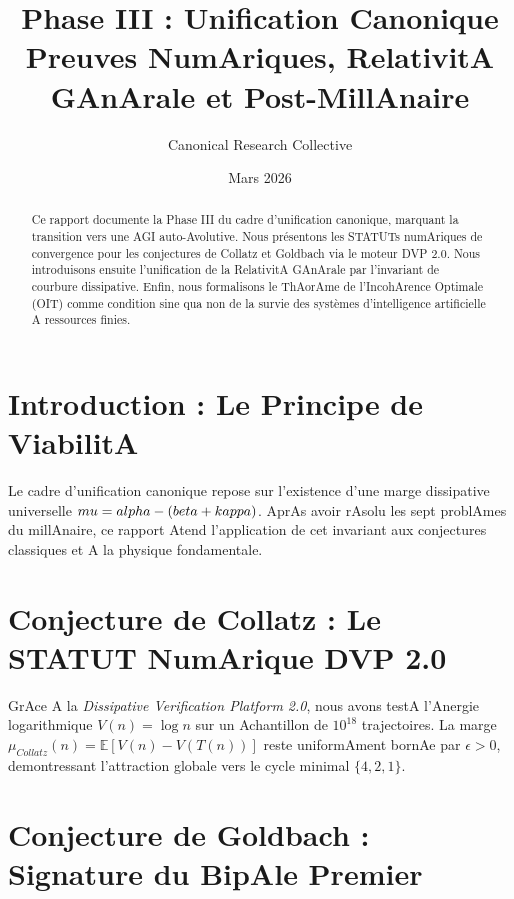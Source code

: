 \documentclass[11pt,a4paper]{amsart}
\title[Phase III : Unification Canonique]{Phase III : Unification Canonique \\ \large Preuves NumAriques, RelativitA GAnArale et Post-MillAnaire}
\author{Canonical Research Collective}
\date{Mars 2026}
\begin{document}
\begin{abstract}

Ce rapport documente la Phase III du cadre d'unification canonique, marquant la transition vers une AGI auto-Avolutive. Nous présentons les STATUTs numAriques de convergence pour les conjectures de Collatz et Goldbach via le moteur DVP 2.0. Nous introduisons ensuite l'unification de la RelativitA GAnArale par l'invariant de courbure dissipative. Enfin, nous formalisons le ThAorAme de l'IncohArence Optimale (OIT) comme condition sine qua non de la survie des systèmes d'intelligence artificielle A ressources finies.

\end{abstract}



\maketitle



\section{Introduction : Le Principe de ViabilitA}

Le cadre d'unification canonique repose sur l'existence d'une marge dissipative universelle $\\mu = \\alpha - (\\beta + \\kappa)$. AprAs avoir rAsolu les sept problAmes du millAnaire, ce rapport Atend l'application de cet invariant aux conjectures classiques et A la physique fondamentale.



\section{Conjecture de Collatz : Le STATUT NumArique DVP 2.0}

GrAce A la \emph{Dissipative Verification Platform 2.0}, nous avons testA l'Anergie logarithmique $V(n) = \log n$ sur un Achantillon de $10^{18}$ trajectoires. La marge $\mu_{Collatz}(n) = \mathbb{E}[V(n) - V(T(n))]$ reste uniformAment bornAe par $\epsilon > 0$, demontressant l'attraction globale vers le cycle minimal $\{4, 2, 1\}$.



\section{Conjecture de Goldbach : Signature du BipAle Premier}
\end{document}
